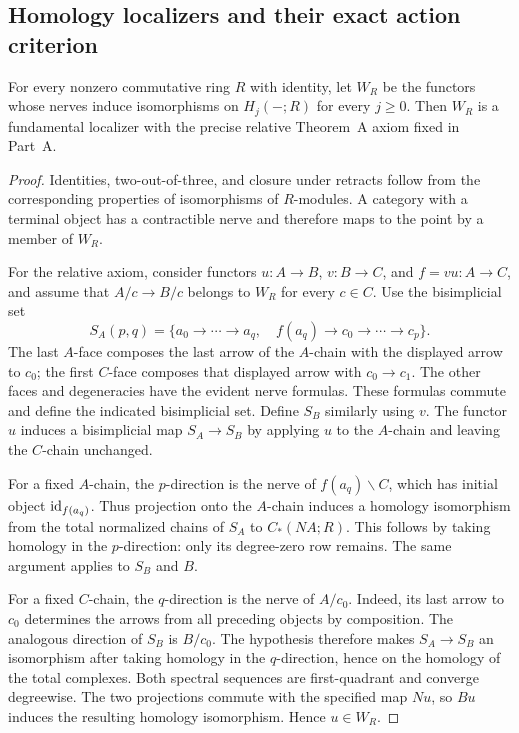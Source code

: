 \subsection{Homology localizers and their exact action criterion}

\begin{proposition}\label{D:homology-localizer}
For every nonzero commutative ring $R$ with identity, let $W_R$ be the functors whose nerves induce isomorphisms on $H_j(-;R)$ for every $j\geq0$. Then $W_R$ is a fundamental localizer with the precise relative Theorem~A axiom fixed in Part~A.
\end{proposition}
\begin{proof}
Identities, two-out-of-three, and closure under retracts follow from the corresponding properties of isomorphisms of $R$-modules. A category with a terminal object has a contractible nerve and therefore maps to the point by a member of $W_R$.

For the relative axiom, consider functors $u:A\to B$, $v:B\to C$, and $f=vu:A\to C$, and assume that $A/c\to B/c$ belongs to $W_R$ for every $c\in C$. Use the bisimplicial set
\[
 S_A(p,q)=\{a_0\to\cdots\to a_q,\quad
                  f(a_q)\to c_0\to\cdots\to c_p\}.
\]
The last $A$-face composes the last arrow of the $A$-chain with the displayed arrow to $c_0$; the first $C$-face composes that displayed arrow with $c_0\to c_1$. The other faces and degeneracies have the evident nerve formulas. These formulas commute and define the indicated bisimplicial set. Define $S_B$ similarly using $v$. The functor $u$ induces a bisimplicial map $S_A\to S_B$ by applying $u$ to the $A$-chain and leaving the $C$-chain unchanged.

For a fixed $A$-chain, the $p$-direction is the nerve of $f(a_q)\backslash C$, which has initial object $\mathrm{id}_{f(a_q)}$. Thus projection onto the $A$-chain induces a homology isomorphism from the total normalized chains of $S_A$ to $C_*(NA;R)$. This follows by taking homology in the $p$-direction: only its degree-zero row remains. The same argument applies to $S_B$ and $B$.

For a fixed $C$-chain, the $q$-direction is the nerve of $A/c_0$. Indeed, its last arrow to $c_0$ determines the arrows from all preceding objects by composition. The analogous direction of $S_B$ is $B/c_0$. The hypothesis therefore makes $S_A\to S_B$ an isomorphism after taking homology in the $q$-direction, hence on the homology of the total complexes. Both spectral sequences are first-quadrant and converge degreewise. The two projections commute with the specified map $Nu$, so $Bu$ induces the resulting homology isomorphism. Hence $u\in W_R$.
\end{proof}

